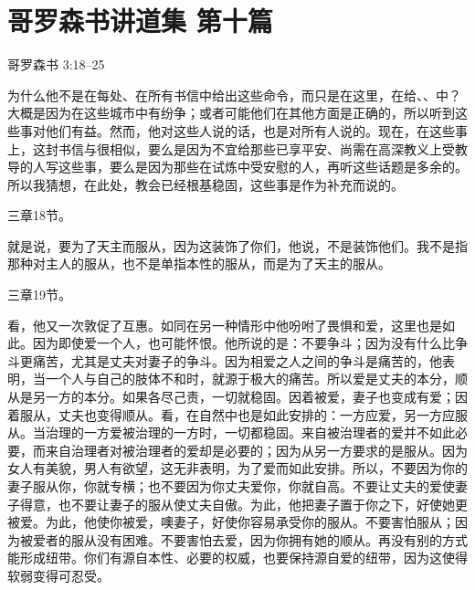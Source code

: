 
\section{哥罗森书讲道集 第十篇}

哥罗森书 3:18–25 \par

\par

为什么他不是在每处、在所有书信中给出这些命令，而只是在这里，在给、、中？大概是因为在这些城市中有纷争；或者可能他们在其他方面是正确的，所以听到这些事对他们有益。然而，他对这些人说的话，也是对所有人说的。现在，在这些事上，这封书信与很相似，要么是因为不宜给那些已享平安、尚需在高深教义上受教导的人写这些事，要么是因为那些在试炼中受安慰的人，再听这些话题是多余的。所以我猜想，在此处，教会已经根基稳固，这些事是作为补充而说的。\par

三章18节。\par

就是说，要为了天主而服从，因为这装饰了你们，他说，不是装饰他们。我不是指那种对主人的服从，也不是单指本性的服从，而是为了天主的服从。\par

三章19节。\par

看，他又一次敦促了互惠。如同在另一种情形中他吩咐了畏惧和爱，这里也是如此。因为即使爱一个人，也可能怀恨。他所说的是：不要争斗；因为没有什么比争斗更痛苦，尤其是丈夫对妻子的争斗。因为相爱之人之间的争斗是痛苦的，他表明，当一个人与自己的肢体不和时，就源于极大的痛苦。所以爱是丈夫的本分，顺从是另一方的本分。如果各尽己责，一切就稳固。因着被爱，妻子也变成有爱；因着服从，丈夫也变得顺从。看，在自然中也是如此安排的：一方应爱，另一方应服从。当治理的一方爱被治理的一方时，一切都稳固。来自被治理者的爱并不如此必要，而来自治理者对被治理者的爱却是必要的；因为从另一方要求的是服从。因为女人有美貌，男人有欲望，这无非表明，为了爱而如此安排。所以，不要因为你的妻子服从你，你就专横；也不要因为你丈夫爱你，你就自高。不要让丈夫的爱使妻子得意，也不要让妻子的服从使丈夫自傲。为此，他把妻子置于你之下，好使她更被爱。为此，他使你被爱，噢妻子，好使你容易承受你的服从。不要害怕服从；因为被爱者的服从没有困难。不要害怕去爱，因为你拥有她的顺从。再没有别的方式能形成纽带。你们有源自本性、必要的权威，也要保持源自爱的纽带，因为这使得软弱变得可忍受。\par

